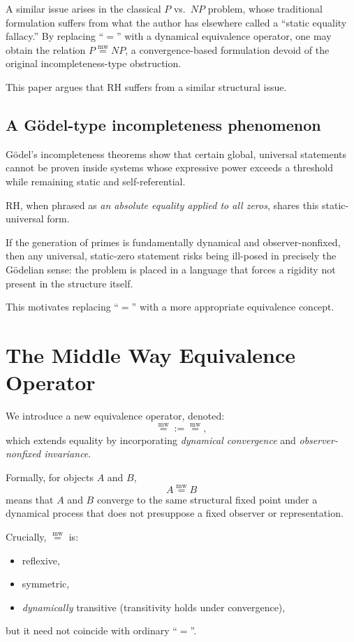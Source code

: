 \documentclass[12pt]{article}
\newcommand{\mweq}{\mathrel{\overset{\mathrm{mw}}{=}}}
\begin{document}
A similar issue arises in the classical $P$ vs.\ $NP$ problem,
whose traditional formulation suffers from what the author has elsewhere
called a ``static equality fallacy.'' 
By replacing ``$=$'' with a dynamical equivalence operator,
one may obtain the relation $P \mweq NP$, a convergence-based formulation
devoid of the original incompleteness-type obstruction.

This paper argues that RH suffers from a similar structural issue.

\subsection*{A Gödel-type incompleteness phenomenon}

Gödel's incompleteness theorems show that certain global, universal statements
cannot be proven inside systems whose expressive power exceeds a threshold
while remaining static and self-referential.

RH, when phrased as \emph{an absolute equality applied to all zeros},
shares this static-universal form.

If the generation of primes is fundamentally dynamical and observer-nonfixed,
then any universal, static-zero statement risks being ill-posed in precisely
the Gödelian sense: the problem is placed in a language that forces a rigidity
not present in the structure itself.

This motivates replacing ``$=$'' with a more appropriate equivalence concept.

\section{The Middle Way Equivalence Operator}

We introduce a new equivalence operator, denoted:
\[
\mweq := \overset{\mathrm{mw}}{=},
\]
which extends equality by incorporating \emph{dynamical convergence}
and \emph{observer-nonfixed invariance}.

Formally, for objects $A$ and $B$,
\[
A \mweq B
\]
means that $A$ and $B$ converge to the same structural fixed point under a 
dynamical process that does not presuppose a fixed observer or representation.

Crucially, $\mweq$ is:
\begin{itemize}
    \item reflexive,
    \item symmetric,
    \item \emph{dynamically} transitive (transitivity holds under convergence),
\end{itemize}
but it need not coincide with ordinary ``$=$''.
\end{document}
